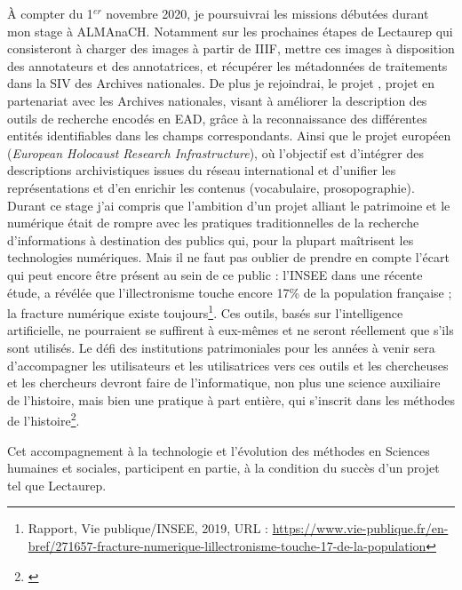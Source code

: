 À compter du 1$^{er}$ novembre 2020, je poursuivrai les missions débutées durant mon stage à ALMAnaCH. Notamment sur les prochaines étapes de Lectaurep qui consisteront à charger des images à partir de IIIF, mettre ces images à disposition des annotateurs et des annotatrices, et récupérer les métadonnées de traitements dans la SIV des Archives nationales. De plus je rejoindrai, le projet , projet en partenariat avec les Archives nationales, visant à améliorer la description des outils de recherche encodés en EAD, grâce à la reconnaissance des différentes entités identifiables dans les champs correspondants. Ainsi que le projet européen  (\textit{European Holocaust Research Infrastructure}), où l'objectif est d'intégrer des descriptions archivistiques issues du réseau international et d'unifier les représentations et d'en enrichir les contenus (vocabulaire, prosopographie).\\

Durant ce stage j'ai compris que l'ambition d'un projet alliant le patrimoine et le numérique était de rompre avec les pratiques traditionnelles de la recherche d'informations à destination des publics qui, pour la plupart maîtrisent les technologies numériques. Mais il ne faut pas oublier de prendre en compte l'écart qui peut encore être présent au sein de ce public : l'INSEE dans une récente étude, a révélée que l'illectronisme touche encore 17\% de la population française ; la fracture numérique existe toujours\footnote{Rapport, Vie publique/INSEE, 2019, URL : \url{https://www.vie-publique.fr/en-bref/271657-fracture-numerique-lillectronisme-touche-17-de-la-population}}. Ces outils, basés sur l'intelligence artificielle, ne pourraient se suffirent à eux-mêmes et ne seront réellement  que s'ils sont utilisés. Le défi des institutions patrimoniales pour les années à venir sera d'accompagner les utilisateurs et les utilisatrices vers ces outils et les chercheuses et les chercheurs devront faire de l'informatique, non plus une science auxiliaire de l'histoire, mais bien une pratique à part entière, qui s'inscrit dans les méthodes  de l'histoire\footnote{\cite{heimburger_faire_2011}}. 

Cet accompagnement à la technologie et l'évolution des méthodes en Sciences humaines et sociales, participent en partie, à la condition du succès d'un projet tel que Lectaurep.

\newpage
\thispagestyle{empty}